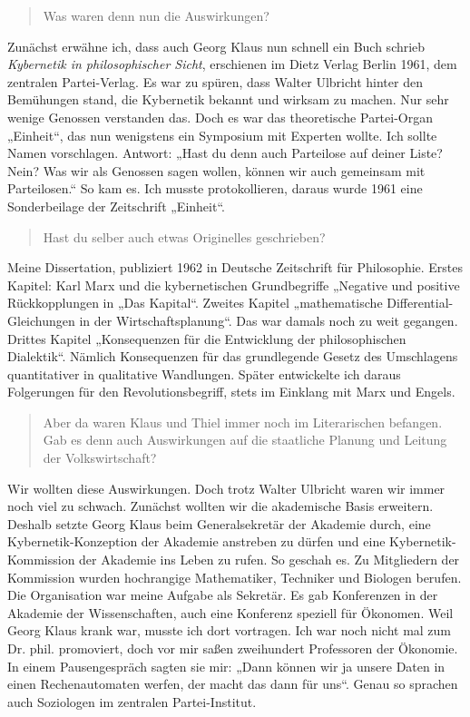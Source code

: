 \documentclass[11pt,a4paper]{article}
\newenvironment{frage}{\begin{quote}}{\end{quote}}
\begin{document}
\begin{frage}
  Was waren denn nun die Auswirkungen?
\end{frage}
Zunächst erwähne ich, dass auch Georg Klaus nun schnell ein Buch schrieb
\emph{Kybernetik in philosophischer Sicht}, erschienen im Dietz Verlag Berlin
1961, dem zentralen Partei-Verlag. Es war zu spüren, dass Walter Ulbricht
hinter den Bemühungen stand, die Kybernetik bekannt und wirksam zu machen. Nur
sehr wenige Genossen verstanden das. Doch es war das theoretische Partei-Organ
„Einheit“, das nun wenigstens ein Symposium mit Experten wollte. Ich sollte
Namen vorschlagen. Antwort: „Hast du denn auch Parteilose auf deiner Liste?
Nein? Was wir als Genossen sagen wollen, können wir auch gemeinsam mit
Parteilosen.“ So kam es. Ich musste protokollieren, daraus wurde 1961 eine
Sonderbeilage der Zeitschrift „Einheit“.
\newpage 
\begin{frage}
  Hast du selber auch etwas Originelles geschrieben?
\end{frage}
Meine Dissertation, publiziert 1962 in Deutsche Zeitschrift für Philosophie.
Erstes Kapitel: Karl Marx und die kybernetischen Grundbegriffe „Negative und
positive Rückkopplungen in „Das Kapital“. Zweites Kapitel „mathematische
Differential-Gleichungen in der Wirtschaftsplanung“. Das war damals noch zu
weit gegangen. Drittes Kapitel „Konsequenzen für die Entwicklung der
philosophischen Dialektik“. Nämlich Konsequenzen für das grundlegende Gesetz
des Umschlagens quantitativer in qualitative Wandlungen. Später entwickelte
ich daraus Folgerungen für den Revolutionsbegriff, stets im Einklang mit Marx
und Engels.

\begin{frage}
  Aber da waren Klaus und Thiel immer noch im Literarischen befangen. Gab es
  denn auch Auswirkungen auf die staatliche Planung und Leitung der
  Volkswirtschaft?
\end{frage}
Wir wollten diese Auswirkungen. Doch trotz Walter Ulbricht waren wir immer
noch viel zu schwach. Zunächst wollten wir die akademische Basis erweitern.
Deshalb setzte Georg Klaus beim Generalsekretär der Akademie durch, eine
Kybernetik-Konzeption der Akademie anstreben zu dürfen und eine
Kybernetik-Kommission der Akademie ins Leben zu rufen. So geschah es. Zu
Mitgliedern der Kommission wurden hochrangige Mathematiker, Techniker und
Biologen berufen. Die Organisation war meine Aufgabe als Sekretär. Es gab
Konferenzen in der Akademie der Wissenschaften, auch eine Konferenz speziell
für Ökonomen. Weil Georg Klaus krank war, musste ich dort vortragen. Ich war
noch nicht mal zum Dr. phil. promoviert, doch vor mir saßen zweihundert
Professoren der Ökonomie. In einem Pausengespräch sagten sie mir: „Dann können
wir ja unsere Daten in einen Rechenautomaten werfen, der macht das dann für
uns“. Genau so sprachen auch Soziologen im zentralen Partei-Institut.
\end{document}

